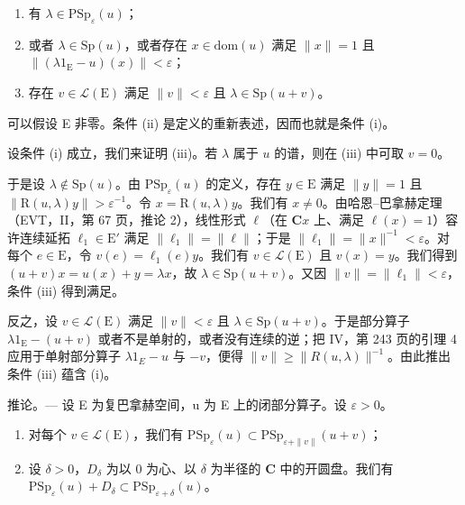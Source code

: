 \begin{enumerate}
\def\labelenumi{(\roman{enumi})}
\item
  有 \(\lambda \in \mathrm{PSp}_{\varepsilon}(u)\)；
\item
  或者 \(\lambda \in \mathrm{Sp}(u)\)，或者存在 \(x \in \mathrm{dom}(u)\) 满足 \(\| x \| = 1\) 且 \(\| (\lambda 1_{\mathrm{E}} - u)(x) \| < \varepsilon\)；
\item
  存在 \(v \in \mathcal{L}(\mathrm{E})\) 满足 \(\| v \| < \varepsilon\) 且 \(\lambda \in \mathrm{Sp}(u + v)\)。
\end{enumerate}

可以假设 E 非零。条件 (ii) 是定义的重新表述，因而也就是条件 (i)。

设条件 (i) 成立，我们来证明 (iii)。若 \(\lambda\) 属于 \(u\) 的谱，则在 (iii) 中可取 \(v = 0\)。

于是设 \(\lambda \notin \mathrm{Sp}(u)\)。由 \(\mathrm{PSp}_{\varepsilon}(u)\) 的定义，存在 \(y \in \mathrm{E}\) 满足 \(\| y \| = 1\) 且 \(\| \mathrm{R}(u, \lambda)y \| > \varepsilon^{-1}\)。令 \(x = \mathrm{R}(u, \lambda)y\)。我们有 \(x \neq 0\)。由哈恩–巴拿赫定理（EVT，II，第 67 页，推论 2），线性形式 \(\ell\)（在 \(\mathbf{C}x\) 上、满足 \(\ell(x) = 1\)）容许连续延拓 \(\ell_1 \in \mathrm{E}'\) 满足 \(\| \ell_1 \| = \| \ell \|\)；于是 \(\| \ell_1 \| = \| x \|^{-1} < \varepsilon\)。对每个 \(e \in \mathrm{E}\)，令 \(v(e) = \ell_1(e)y\)。我们有 \(v \in \mathcal{L}(\mathrm{E})\) 且 \(v(x) = y\)。我们得到 \((u + v)x = u(x) + y = \lambda x\)，故 \(\lambda \in \mathrm{Sp}(u + v)\)。又因 \(\| v \| = \| \ell_1 \| < \varepsilon\)，条件 (iii) 得到满足。

反之，设 \(v \in \mathcal{L}(\mathrm{E})\) 满足 \(\|v\| < \varepsilon\) 且 \(\lambda \in \mathrm{Sp}(u + v)\)。于是部分算子 \(\lambda1_{\mathrm{E}} - (u + v)\) 或者不是单射的，或者没有连续的逆；把 IV，第 243 页的引理 4 应用于单射部分算子 \(\lambda1_{E} - u\) 与 \(-v\)，便得 \(\|v\| \geqslant \|R(u, \lambda)\|^{-1}\)。由此推出条件 (iii) 蕴含 (i)。

推论。— 设 E 为复巴拿赫空间，u 为 E 上的闭部分算子。设 \(\varepsilon > 0\)。

\begin{enumerate}
\def\labelenumi{\alph{enumi})}
\item
  对每个 \(v \in \mathcal{L}(\mathrm{E})\)，我们有 \(\mathrm{PSp}_{\varepsilon}(u) \subset \mathrm{PSp}_{\varepsilon + \| v\|}(u + v)\)；
\item
  设 \(\delta > 0\)，\(D_{\delta}\) 为以 0 为心、以 \(\delta\) 为半径的 \(\mathbf{C}\) 中的开圆盘。我们有 \(\mathrm{PSp}_{\varepsilon}(u) + D_{\delta} \subset \mathrm{PSp}_{\varepsilon + \delta}(u)\)。
\end{enumerate}

